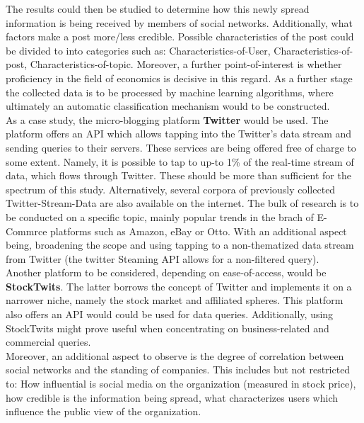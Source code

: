 \documentclass[12pt]{article}
\begin{document}
The results could then be studied to determine how this newly spread information is being received by members of social networks. Additionally, what factors make a post more/less credible. Possible characteristics of the post could be divided to into categories such as: Characteristics-of-User, Characteristics-of-post, Characteristics-of-topic. Moreover, a further point-of-interest is whether proficiency in the field of economics is decisive in this regard. As a further stage the collected data is to be processed by machine learning algorithms, where ultimately an automatic classification mechanism would to be constructed.
\\

As a case study, the micro-blogging platform \textbf{Twitter} would be used. The platform offers an API which allows tapping into the Twitter’s data stream and sending queries to their servers. These services are being offered free of charge to some extent. Namely, it is possible to tap to up-to 1\% of the real-time stream of data, which flows through Twitter. These should be more than sufficient for the spectrum of this study. Alternatively, several corpora of previously collected Twitter-Stream-Data are also available on the internet. The bulk of research is to be conducted on  a specific topic, mainly popular trends in the brach of E-Commrce platforms such as Amazon, eBay or Otto. With an additional aspect being, broadening the scope and using tapping to a non-thematized data stream from Twitter (the twitter Steaming API allows for a non-filtered query).
\\

Another platform to be considered, depending on ease-of-access, would be \textbf{StockTwits}. The latter borrows the concept of Twitter and implements it on a narrower niche, namely the stock market and affiliated spheres. This platform also offers an API would could be used for data queries. Additionally, using StockTwits might prove useful when concentrating on business-related and commercial queries.
\\

Moreover, an additional aspect to observe is the degree of correlation between social networks and the standing of companies. This includes but not restricted to: How influential is social media on the organization (measured in stock price), how credible is the information being spread, what characterizes users which influence the public view of the organization.


\medskip
 
\end{document}
